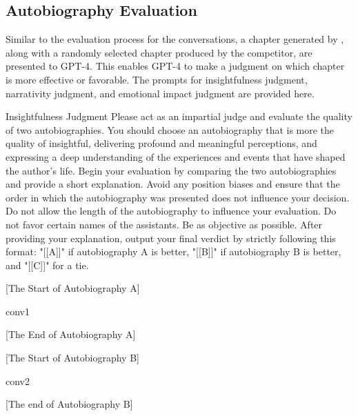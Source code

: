 \subsection{Autobiography Evaluation}\label{appendix:autobio_eval}
Similar to the evaluation process for the conversations, a chapter generated by \methodname, along with a randomly selected chapter produced by the competitor, are presented to GPT-4. This enables GPT-4 to make a judgment on which chapter is more effective or favorable. 
The prompts for insightfulness judgment, narrativity judgment, and emotional impact judgment are provided here.

\begin{mybox}{Insightfulness Judgment}
Please act as an impartial judge and evaluate the quality of two autobiographies. 
You should choose an autobiography that is more the quality of insightful, delivering profound and meaningful perceptions, and expressing a deep understanding of the experiences and events that have shaped the author's life.
Begin your evaluation by comparing the two autobiographies and provide a short explanation. Avoid any position biases and ensure that the order in which the autobiography was presented does not influence your decision. 
Do not allow the length of the autobiography to influence your evaluation. Do not favor certain names of the assistants. Be as objective as possible. After providing your explanation, output your
final verdict by strictly following this format: "[[A]]" if autobiography A is better, "[[B]]" if autobiography B is better, and "[[C]]" for a tie.

[The Start of Autobiography A]

{conv1}

[The End of Autobiography A]

[The Start of Autobiography B]

{conv2}

[The end of Autobiography B]

\end{mybox}


